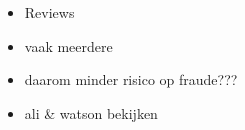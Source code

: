 \documentclass{ou-report}
\newcommand{\todo}[1]{{\color{red} TODO: #1}}
\newcommand{\outline}[1]{{\color{blue} #1}}
\begin{document}







\outline{
\begin{itemize}
    \item Reviews
    \item vaak meerdere
    \item daarom minder risico op fraude???
    \item ali \& watson bekijken
\end{itemize}
}
\end{document}
